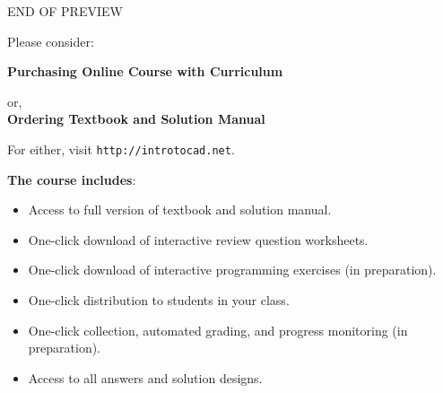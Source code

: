 \documentclass{article}
\newif\iffullversion
\begin{document}
\iffullversion
\else
\vbox{}
\vfill
\pagestyle{empty}
    \begin{center}
    {\huge \color{red}END OF PREVIEW}\\[2cm]

\centerline{\Large Please consider:}
\vspace{1cm}

{\Large \bf Purchasing Online Course with Curriculum}
\vspace{1cm}

    {\Large or,}\\[1cm]

{\Large \bf Ordering Textbook and Solution Manual}
\vspace{1cm}

    {\Large For either, visit {\tt http://introtocad.net}. \\[2cm]
}
\end{center}
{\bf The course includes}:
\begin{itemize}
\item Access to full version of textbook and solution manual.
\item One-click download of interactive review question worksheets.
\item One-click download of interactive programming exercises (in preparation).
\item One-click distribution to students in your class.
\item One-click collection, automated grading, and progress monitoring (in preparation).
\item Access to all answers and solution designs.
\end{itemize}

\vfill
    
\end{document}
